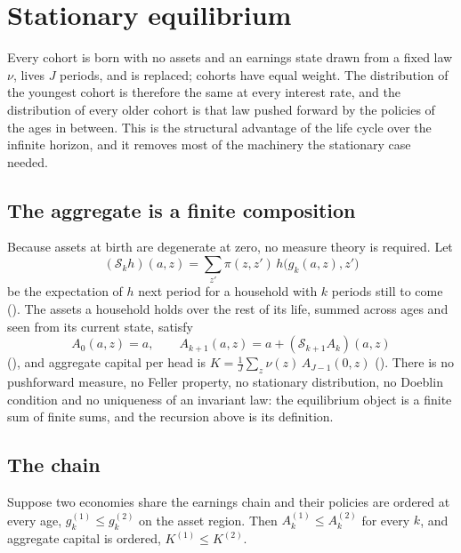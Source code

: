 \section{Stationary equilibrium}\label{sec:eqm}

Every cohort is born with no assets and an earnings state drawn from a fixed law $\nu$, lives $J$
periods, and is replaced; cohorts have equal weight. The distribution of the youngest cohort is
therefore the same at every interest rate, and the distribution of every older cohort is that law
pushed forward by the policies of the ages in between. This is the structural advantage of the
life cycle over the infinite horizon, and it removes most of the machinery the stationary case
needed.

\subsection{The aggregate is a finite composition}

Because assets at birth are degenerate at zero, no measure theory is required. Let
\[
  (\mathcal{S}_k h)(a,z)=\sum_{z'}\pi(z,z')\,h\bigl(g_k(a,z),z'\bigr)
\]
be the expectation of $h$ next period for a household with $k$ periods still to come
(). The assets a household holds over the rest of its life, summed across ages
and seen from its current state, satisfy
\[
  A_0(a,z)=a,\qquad A_{k+1}(a,z)=a+(\mathcal{S}_{k+1}A_k)(a,z)
\]
(), and aggregate capital per head is
$K=\frac1J\sum_z\nu(z)\,A_{J-1}(0,z)$ (). There is no pushforward measure, no
Feller property, no stationary distribution, no Doeblin condition and no uniqueness of an
invariant law: the equilibrium object is a finite sum of finite sums, and the recursion above is
its definition.

\subsection{The chain}

\begin{theorem}\label{thm:thm2}
Suppose two economies share the earnings chain and their policies are ordered at every age,
$g^{(1)}_k\le g^{(2)}_k$ on the asset region. Then $A^{(1)}_k\le A^{(2)}_k$ for every $k$, and
aggregate capital is ordered, $K^{(1)}\le K^{(2)}$.
\end{theorem}

